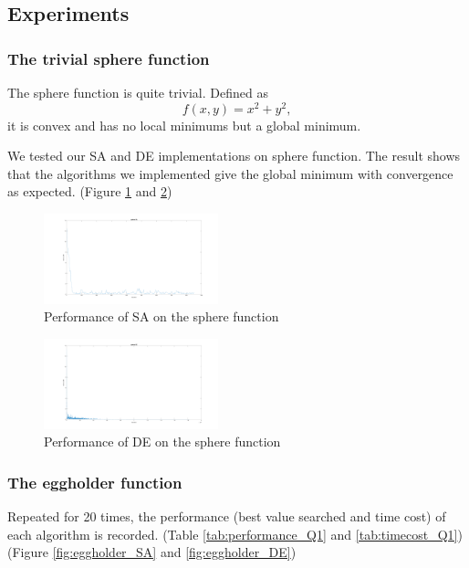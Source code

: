 \documentclass{IEEEtran}
\begin{document}
{    \subsection{Experiments}
    {
        \subsubsection{The trivial sphere function}
        {
            The sphere function is quite trivial. 
            Defined as
            $$f(x, y) = x^2 + y^2,$$
            it is convex and has no local minimums but a global minimum.

            We tested our SA and DE implementations on sphere function. 
            The result shows that the algorithms we implemented give the global minimum with convergence as expected. 
            (Figure \ref{fig:sphere_SA} and \ref{fig:sphere_DE})

            \begin{figure}[!htbp]
                \centering
                \includegraphics[width=0.45\textwidth]{Q1/figures/sphere_SA.png}
                \caption{Performance of SA on the sphere function}
                \label{fig:sphere_SA}
            \end{figure}

            \begin{figure}[!htbp]
                \centering
                \includegraphics[width=0.45\textwidth]{Q1/figures/sphere_DE.png}
                \caption{Performance of DE on the sphere function}
                \label{fig:sphere_DE}
            \end{figure}
        }

        \subsubsection{The eggholder function}
        {
            Repeated for 20 times, the performance (best value searched and time cost) of each algorithm is recorded. 
            (Table \ref{tab:performance_Q1} and \ref{tab:timecost_Q1})
            (Figure \ref{fig:eggholder_SA} and \ref{fig:eggholder_DE})

}}}
\end{document}
